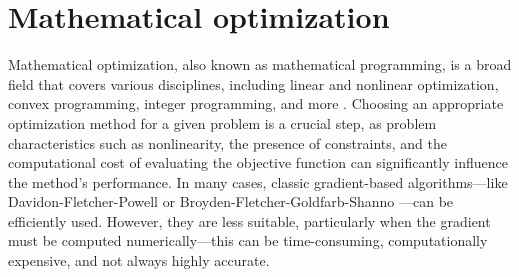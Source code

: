 \chapter{Mathematical optimization}\label{optimization}

%
%

%
%
%

Mathematical optimization, also known as mathematical programming, is a broad field that covers various disciplines, including linear and nonlinear optimization, convex programming, integer programming, and more \cite{Kochenderfer2019}. Choosing an appropriate optimization method for a given problem is a crucial step, as problem characteristics such as nonlinearity, the presence of constraints, and the computational cost of evaluating the objective function can significantly influence the method's performance. In many cases, classic gradient-based algorithms—like Davidon-Fletcher-Powell \cite{Fletcher1963} or Broyden-Fletcher-Goldfarb-Shanno \cite{broyden1970}—can be efficiently used. However, they are less suitable, particularly when the gradient must be computed numerically—this can be time-consuming, computationally expensive, and not always highly accurate.

